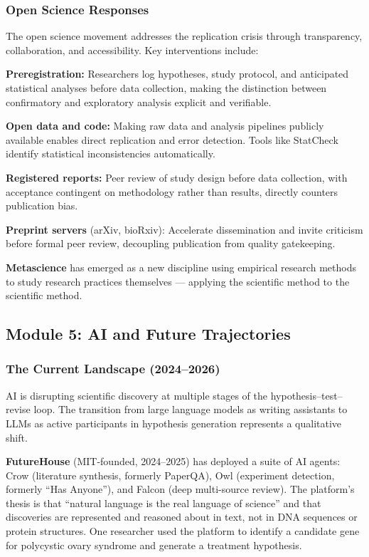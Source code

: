\documentclass[11pt,letterpaper]{article}
\begin{document}
\subsubsection{Open Science Responses}

The open science movement addresses the replication crisis through transparency, collaboration, and accessibility. Key interventions include:

\textbf{Preregistration:} Researchers log hypotheses, study protocol, and anticipated statistical analyses before data collection, making the distinction between confirmatory and exploratory analysis explicit and verifiable.

\textbf{Open data and code:} Making raw data and analysis pipelines publicly available enables direct replication and error detection. Tools like StatCheck identify statistical inconsistencies automatically.

\textbf{Registered reports:} Peer review of study design before data collection, with acceptance contingent on methodology rather than results, directly counters publication bias.

\textbf{Preprint servers} (arXiv, bioRxiv): Accelerate dissemination and invite criticism before formal peer review, decoupling publication from quality gatekeeping.

\textbf{Metascience} has emerged as a new discipline using empirical research methods to study research practices themselves --- applying the scientific method to the scientific method.

\subsection{Module 5: AI and Future Trajectories}

\subsubsection{The Current Landscape (2024--2026)}

AI is disrupting scientific discovery at multiple stages of the hypothesis--test--revise loop. The transition from large language models as writing assistants to LLMs as active participants in hypothesis generation represents a qualitative shift.

\textbf{FutureHouse} (MIT-founded, 2024--2025) has deployed a suite of AI agents: Crow (literature synthesis, formerly PaperQA), Owl (experiment detection, formerly ``Has Anyone''), and Falcon (deep multi-source review). The platform's thesis is that ``natural language is the real language of science'' and that discoveries are represented and reasoned about in text, not in DNA sequences or protein structures. One researcher used the platform to identify a candidate gene for polycystic ovary syndrome and generate a treatment hypothesis.
\end{document}
